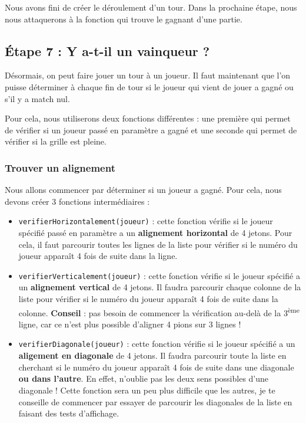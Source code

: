 \documentclass[11pt]{article}
\begin{document}
Nous avons fini de créer le déroulement d'un tour. Dans la prochaine étape, nous nous attaquerons à la fonction qui trouve le gagnant d'une partie.

\subsection*{Étape 7 : Y a-t-il un vainqueur ?}
\label{puissance4_etape7}
Désormais, on peut faire jouer un tour à un joueur. Il faut maintenant que l'on puisse déterminer à chaque fin de tour si le joueur qui vient de jouer a gagné ou s'il y a match nul.

Pour cela, nous utiliserons deux fonctions différentes : une première qui permet de vérifier si un joueur passé en paramètre a gagné et une seconde qui permet de vérifier si la grille est pleine.

\subsubsection*{Trouver un alignement}
\label{sec:orgef45479}
Nous allons commencer par déterminer si un joueur a gagné. Pour cela, nous devons créer 3 fonctions intermédiaires :
\begin{itemize}
\item \texttt{verifierHorizontalement(joueur)} : cette fonction vérifie si le joueur spécifié passé en paramètre a un \textbf{alignement horizontal} de 4 jetons. Pour cela, il faut parcourir toutes les lignes de la liste pour vérifier si le numéro du joueur apparaît 4 fois de suite dans la ligne.
\item \texttt{verifierVerticalement(joueur)} : cette fonction vérifie si le joueur spécifié a un \textbf{alignement vertical} de 4 jetons. Il faudra parcourir chaque colonne de la liste pour vérifier si le numéro du joueur apparaît 4 fois de suite dans la colonne. \textbf{Conseil} : pas besoin de commencer la vérification au-delà de la 3\textsuperscript{ème} ligne, car ce n'est plus possible d'aligner 4 pions sur 3 lignes !
\item \texttt{verifierDiagonale(joueur)} : cette fonction vérifie si le joueur spécifié a un \textbf{aligement en diagonale} de 4 jetons. Il faudra parcourir toute la liste en cherchant si le numéro du joueur apparaît 4 fois de suite dans une diagonale \textbf{ou dans l'autre}. En effet, n'oublie pas les deux sens possibles d'une diagonale ! Cette fonction sera un peu plus difficile que les autres, je te conseille de commencer par essayer de parcourir les diagonales de la liste en faisant des tests d'affichage.
\end{itemize}
\end{document}
